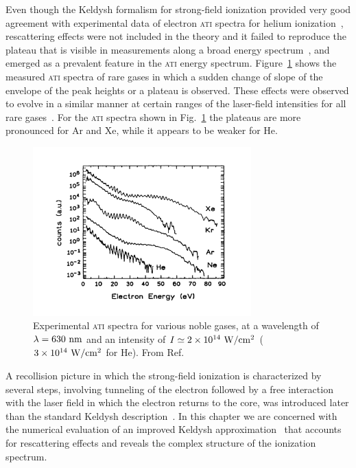 Even though the Keldysh formalism for strong-field ionization provided
very good agreement with experimental data of electron \textsc{ati}
spectra for helium ionization~\cite{Walker_1994exp}, rescattering
effects were not included in the theory and it failed to reproduce the
plateau that is visible in measurements along a broad energy
spectrum~\cite{Paulus_1994plateau, Walker_1996}, and emerged as a
prevalent feature in the \textsc{ati} energy
spectrum. Figure~\ref{fig:plateau_ATI} shows the measured \textsc{ati}
spectra of rare gases in which a sudden change of slope of the
envelope of the peak heights or a plateau is observed. These effects
were observed to evolve in a similar manner at certain ranges of the
laser-field intensities for all rare
gases~\cite{Paulus_1994plateau}. For the \textsc{ati} spectra shown in
Fig.~\ref{fig:plateau_ATI} the plateaus are more pronounced for Ar and
Xe, while it appears to be weaker for He.

\begin{figure}
  \centering
  \includegraphics[width=0.75\textwidth]{figures/ch_ATI_SFA/plateauPRL72}
  \caption{Experimental \textsc{ati} spectra for various noble gases,
    at a wavelength of $\lambda = 630\ \rm{nm}$ and an intensity of $I
    \simeq 2\times 10^{14}\ \rm{W/cm^{2}}$ ($3\times
    10^{14}\ \rm{W/cm^{2}}$ for He). From
    Ref.~\cite{Paulus_1994plateau}}
  \label{fig:plateau_ATI}
\end{figure}

A recollision picture in which the strong-field ionization is
characterized by several steps, involving tunneling of the electron
followed by a free interaction with the laser field in which the
electron returns to the core, was introduced later than the standard
Keldysh description~\cite{Corkum_1993, LewensteinSPA_1994}. In this
chapter we are concerned with the numerical evaluation of an improved
Keldysh approximation~\cite{Kopold_1997sfa} that accounts for
rescattering effects and reveals the complex structure of the
ionization spectrum.

